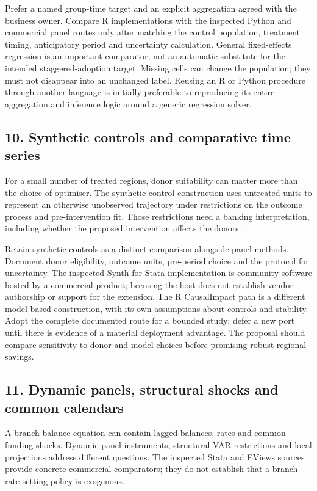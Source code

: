 Prefer a named group-time target and an explicit aggregation agreed with the
business owner. Compare R implementations with the inspected Python and
commercial panel routes only after matching the control population, treatment
timing, anticipatory period and uncertainty calculation. General fixed-effects
regression is an important comparator, not an automatic substitute for the
intended staggered-adoption target.
\citep{exec20_fixest_source,exec24_panelpy_differences,exec18_gp_stata_xthdid}
Missing cells can change the population; they must not disappear into an
unchanged label. Reusing an R or Python procedure through another language is
initially preferable to reproducing its entire aggregation and inference
logic around a generic regression solver.

\subsection{10. Synthetic controls and comparative time series}
For a small number of treated regions, donor suitability can matter more than
the choice of optimiser. The synthetic-control construction uses untreated
units to represent an otherwise unobserved trajectory under restrictions on
the outcome process and pre-intervention fit. Those restrictions need a
banking interpretation, including whether the proposed intervention affects
the donors.
\citep{abadie2010}

Retain synthetic controls as a distinct comparison alongside panel methods.
Document donor eligibility, outcome units, pre-period choice and the protocol
for uncertainty. The inspected Synth-for-Stata implementation is community
software hosted by a commercial product; licensing the host does not establish
vendor authorship or support for the extension. The R CausalImpact path is a
different model-based construction, with its own assumptions about controls
and stability.
\citep{exec19_synth_stata_source,exec13_ci_r,exec13_ci_semantics}
Adopt the complete documented route for a bounded study; defer a new port until
there is evidence of a material deployment advantage. The proposal should
compare sensitivity to donor and model choices before promising robust regional
savings.

\subsection{11. Dynamic panels, structural shocks and common calendars}
A branch balance equation can contain lagged balances, rates and common funding
shocks. Dynamic-panel instruments, structural VAR restrictions and local
projections address different questions. The inspected Stata and EViews sources
provide concrete commercial comparators; they do not establish that a branch
rate-setting policy is exogenous.
\citep{exec19_dynamic_stata_ab,exec19_dynamic_stata_system,
exec19_dynamic_stata_lp,exec19_dynamic_eviews_panel}


